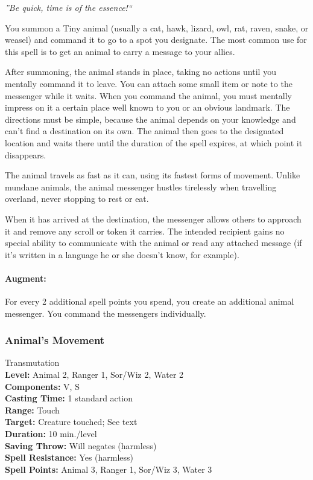 \emph{''Be quick, time is of the essence!``}

You summon a Tiny animal (usually a cat, hawk, lizard, owl, rat, raven, snake, or weasel) and command it to go to a spot you designate.
The most common use for this spell is to get an animal to carry a message to your allies. 

After summoning, the animal stands in place, taking no actions until you mentally command it to leave.
You can attach some small item or note to the messenger while it waits.
When you command the animal, you must mentally impress on it a certain place well known to you or an obvious landmark. 
The directions must be simple, because the animal depends on your knowledge and can't find a destination on its own. 
The animal then goes to the designated location and waits there until the duration of the spell expires, at which point it disappears.

The animal travels as fast as it can, using its fastest forms of movement. Unlike mundane animals, the animal messenger hustles tirelessly when travelling overland, never stopping to rest or eat.

When it has arrived at the destination, the messenger allows others to approach it and remove any scroll or token it carries. 
The intended recipient gains no special ability to communicate with the animal or read any attached message (if it's written in a language he or she doesn't know, for example).

\paragraph{Augment:} For every 2 additional spell points you spend, you create an additional animal messenger. You command the messengers individually.

\subsubsection{Animal's Movement}
\label{Spell:AnimalsMovement}
Transmutation
\\ \textbf{Level:} Animal 2, Ranger 1, Sor/Wiz 2, Water 2
\\ \textbf{Components:} V, S
\\ \textbf{Casting Time:} 1 standard action
\\ \textbf{Range:} Touch
\\ \textbf{Target:} Creature touched; See text
\\ \textbf{Duration:} 10 min./level
\\ \textbf{Saving Throw:} Will negates (harmless)
\\ \textbf{Spell Resistance:} Yes (harmless)
\\ \textbf{Spell Points:} Animal 3, Ranger 1, Sor/Wiz 3, Water 3

